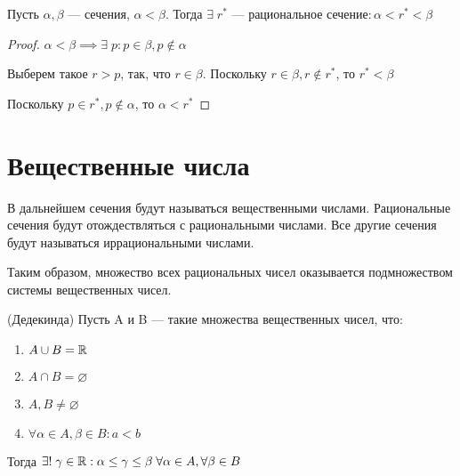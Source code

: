 \begin{theorem}
    Пусть $\alpha, \beta$ --- сечения, $\alpha < \beta$. Тогда $\exists \; r^* \text{ --- рациональное сечение}: \alpha< r^* < \beta$
\end{theorem}

\begin{proof}
    $\alpha < \beta \implies \exists \; p: p \in \beta, p \notin \alpha$

    Выберем такое $r > p$, так, что $r \in \beta$. Поскольку $r \in \beta, r \notin r^*$, то $r^* < \beta$

    Поскольку $p \in r^*, p \notin \alpha$, то $ \alpha < r^*$
\end{proof}

\chapter{Вещественные числа}

\begin{definition}
    В дальнейшем сечения будут называться вещественными числами. Рациональные сечения будут отождествляться с рациональными числами. Все другие сечения будут называться иррациональными числами.

    Таким образом, множество всех рациональных чисел оказывается подмножеством системы вещественных чисел.
\end{definition}

\begin{theorem} (Дедекинда)
    Пусть A и B --- такие множества вещественных чисел, что:
    \begin{enumerate}
        \item $A \cup B = \mathbb{R}$
        \item $A \cap B = \varnothing$
        \item $A, B \neq \varnothing$
        \item $\forall \alpha \in A, \beta \in B: a < b$
    \end{enumerate}

    Тогда $\exists! \; \gamma \in \mathbb{R}: \alpha \leq \gamma \leq \beta \; \forall \alpha \in A, \forall \beta \in B$
\end{theorem}

